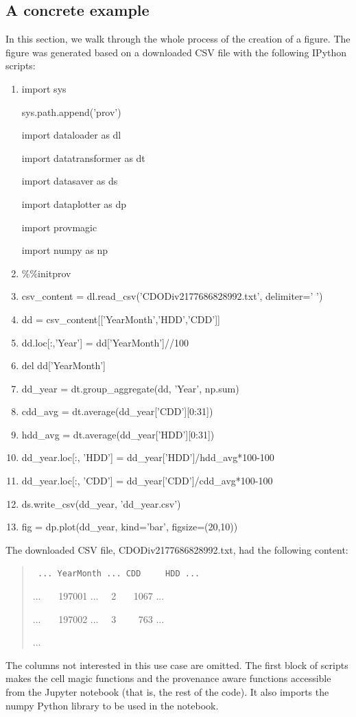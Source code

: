\subsection{A concrete example}
In this section, we walk through the whole process of the creation of a figure. The figure was generated based on a downloaded CSV file with the following IPython scripts:
\begin{enumerate}
	\item\noindent import sys
	
	\noindent sys.path.append('prov')
	
	\noindent import dataloader as dl
	
	\noindent import datatransformer as dt
	
	\noindent import datasaver as ds
	
	\noindent import dataplotter as dp
	
	\noindent import provmagic
	
	\noindent import numpy as np
	\item \%\%initprov
	\item csv\_content = dl.read\_csv('CDODiv2177686828992.txt', delimiter=' ')
	\item dd = csv\_content[['YearMonth','HDD','CDD']]
	\item dd.loc[:,'Year'] = dd['YearMonth']//100
	\item del dd['YearMonth']
	\item dd\_year = dt.group\_aggregate(dd, 'Year', np.sum)
	\item cdd\_avg = dt.average(dd\_year['CDD'][0:31])
	\item hdd\_avg = dt.average(dd\_year['HDD'][0:31])
	\item dd\_year.loc[:, 'HDD'] = dd\_year['HDD']/hdd\_avg*100-100
	\item dd\_year.loc[:, 'CDD'] = dd\_year['CDD']/cdd\_avg*100-100
	\item ds.write\_csv(dd\_year, 'dd\_year.csv')
	\item fig = dp.plot(dd\_year, kind='bar', figsize=(20,10))
\end{enumerate}
The downloaded CSV file, CDODiv2177686828992.txt, had the following content:
\begin{quotation}\tt
	\noindent ... YearMonth ... CDD \ \ \ \ HDD ...
	 
	\noindent ... \ \ \ 197001 ... \ \ 2 \ \ \ 1067 ...
	 
	\noindent ... \ \ \ 197002 ... \ \ 3 \ \ \ \ 763 ...
	
	\noindent ... 
\end{quotation}
The columns not interested in this use case are omitted. The first block of scripts makes the cell magic functions and the provenance aware functions accessible from the Jupyter notebook (that is, the rest of the code). It also imports the numpy Python library to be used in the notebook.

